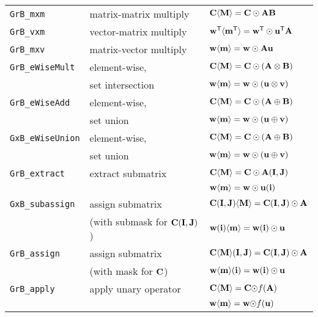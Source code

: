 \documentclass[12pt]{article}
\begin{document}
\vspace{0.05in}
{\footnotesize
\begin{tabular}{lll}
\hline
\verb'GrB_mxm'       & matrix-matrix multiply  & ${\bf C \langle M \rangle = C \odot AB}$ \\
\verb'GrB_vxm'       & vector-matrix multiply  & ${\bf w^{\sf T}\langle m^{\sf T}\rangle = w^{\sf T}\odot u^{\sf T}A}$ \\
\verb'GrB_mxv'       & matrix-vector multiply  & ${\bf w \langle m \rangle = w \odot Au}$ \\
\hline
\verb'GrB_eWiseMult' & element-wise,           & ${\bf C \langle M \rangle = C \odot (A \otimes B)}$ \\
                     & set intersection        & ${\bf w \langle m \rangle = w \odot (u \otimes v)}$ \\
\hline
\verb'GrB_eWiseAdd'  & element-wise,           & ${\bf C \langle M \rangle = C \odot (A \oplus  B)}$ \\
                     & set union               & ${\bf w \langle m \rangle = w \odot (u \oplus  v)}$ \\
\hline
\verb'GxB_eWiseUnion'& element-wise,           & ${\bf C \langle M \rangle = C \odot (A \oplus  B)}$ \\
                     & set union               & ${\bf w \langle m \rangle = w \odot (u \oplus  v)}$ \\
\hline
\verb'GrB_extract'   & extract submatrix       & ${\bf C \langle M \rangle = C \odot A(I,J)}$ \\
                     &                         & ${\bf w \langle m \rangle = w \odot u(i)}$ \\
\hline
\verb'GxB_subassign' & assign submatrix        & ${\bf C (I,J) \langle M \rangle = C(I,J) \odot A}$ \\
                     & (with submask for ${\bf C(I,J)}$)
                                               & ${\bf w (i)   \langle m \rangle = w(i)   \odot u}$ \\
\hline
\verb'GrB_assign'    & assign submatrix        & ${\bf C \langle M \rangle (I,J) = C(I,J) \odot A}$ \\
                     & (with mask for ${\bf C}$)
                                               & ${\bf w \langle m \rangle (i)   = w(i)   \odot u}$ \\
\hline
\verb'GrB_apply'     & apply unary operator    & ${\bf C \langle M \rangle = C \odot} f{\bf (A)}$ \\
                     &                         & ${\bf w \langle m \rangle = w \odot} f{\bf (u)}$ \\

\end{tabular}}
\end{document}
